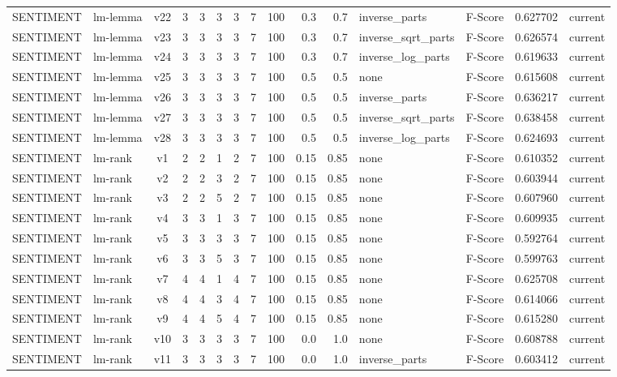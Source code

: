 \documentclass{article}
\begin{document}
\begin{xltabular}{\linewidth}{@{}lYcrrrrrrrrYlrl@{}}
SENTIMENT & lm-lemma & v22 & 3 & 3 & 3 & 3 & 7 & 100 & 0.3 & 0.7 & inverse\_parts & F-Score & 0.627702 & current \\
SENTIMENT & lm-lemma & v23 & 3 & 3 & 3 & 3 & 7 & 100 & 0.3 & 0.7 & inverse\_sqrt\_parts & F-Score & 0.626574 & current \\
SENTIMENT & lm-lemma & v24 & 3 & 3 & 3 & 3 & 7 & 100 & 0.3 & 0.7 & inverse\_log\_parts & F-Score & 0.619633 & current \\
SENTIMENT & lm-lemma & v25 & 3 & 3 & 3 & 3 & 7 & 100 & 0.5 & 0.5 & none & F-Score & 0.615608 & current \\
SENTIMENT & lm-lemma & v26 & 3 & 3 & 3 & 3 & 7 & 100 & 0.5 & 0.5 & inverse\_parts & F-Score & 0.636217 & current \\
SENTIMENT & lm-lemma & v27 & 3 & 3 & 3 & 3 & 7 & 100 & 0.5 & 0.5 & inverse\_sqrt\_parts & F-Score & 0.638458 & current \\
SENTIMENT & lm-lemma & v28 & 3 & 3 & 3 & 3 & 7 & 100 & 0.5 & 0.5 & inverse\_log\_parts & F-Score & 0.624693 & current \\
SENTIMENT & lm-rank & v1 & 2 & 2 & 1 & 2 & 7 & 100 & 0.15 & 0.85 & none & F-Score & 0.610352 & current \\
SENTIMENT & lm-rank & v2 & 2 & 2 & 3 & 2 & 7 & 100 & 0.15 & 0.85 & none & F-Score & 0.603944 & current \\
SENTIMENT & lm-rank & v3 & 2 & 2 & 5 & 2 & 7 & 100 & 0.15 & 0.85 & none & F-Score & 0.607960 & current \\
SENTIMENT & lm-rank & v4 & 3 & 3 & 1 & 3 & 7 & 100 & 0.15 & 0.85 & none & F-Score & 0.609935 & current \\
SENTIMENT & lm-rank & v5 & 3 & 3 & 3 & 3 & 7 & 100 & 0.15 & 0.85 & none & F-Score & 0.592764 & current \\
SENTIMENT & lm-rank & v6 & 3 & 3 & 5 & 3 & 7 & 100 & 0.15 & 0.85 & none & F-Score & 0.599763 & current \\
SENTIMENT & lm-rank & v7 & 4 & 4 & 1 & 4 & 7 & 100 & 0.15 & 0.85 & none & F-Score & 0.625708 & current \\
SENTIMENT & lm-rank & v8 & 4 & 4 & 3 & 4 & 7 & 100 & 0.15 & 0.85 & none & F-Score & 0.614066 & current \\
SENTIMENT & lm-rank & v9 & 4 & 4 & 5 & 4 & 7 & 100 & 0.15 & 0.85 & none & F-Score & 0.615280 & current \\
SENTIMENT & lm-rank & v10 & 3 & 3 & 3 & 3 & 7 & 100 & 0.0 & 1.0 & none & F-Score & 0.608788 & current \\
SENTIMENT & lm-rank & v11 & 3 & 3 & 3 & 3 & 7 & 100 & 0.0 & 1.0 & inverse\_parts & F-Score & 0.603412 & current \\

\end{xltabular}
\end{document}
